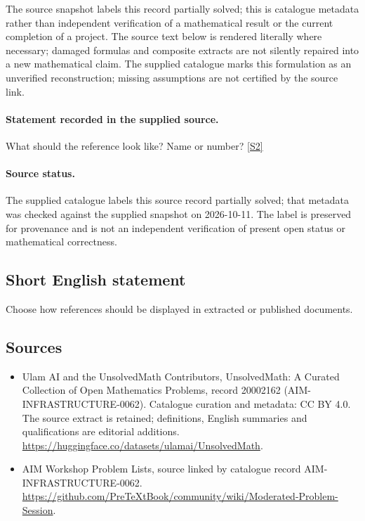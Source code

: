 \documentclass[11pt]{article}
\begin{document}
The source snapshot labels this record partially solved; this is catalogue metadata rather than independent verification of a mathematical result or the current completion of a project.
The source text below is rendered literally where necessary; damaged formulas and composite extracts are not silently repaired into a new mathematical claim.
The supplied catalogue marks this formulation as an unverified reconstruction; missing assumptions are not certified by the source link.
\paragraph{Statement recorded in the supplied source.}
What should the reference look like? Name or number? \href{https://github.com/PreTeXtBook/community/wiki/Moderated-Problem-Session}{[S2]}
\paragraph{Source status.}
The supplied catalogue labels this source record partially solved; that metadata was checked against the supplied snapshot on 2026-10-11. The label is preserved for provenance and is not an independent verification of present open status or mathematical correctness.
\subsection{Short English statement}
Choose how references should be displayed in extracted or published documents.
\subsection{Sources}
\begin{itemize}
\item[S1] Ulam AI and the UnsolvedMath Contributors, UnsolvedMath: A Curated Collection of Open Mathematics Problems, record 20002162 (AIM-INFRASTRUCTURE-0062). Catalogue curation and metadata: CC BY 4.0. The source extract is retained; definitions, English summaries and qualifications are editorial additions.
\url{https://huggingface.co/datasets/ulamai/UnsolvedMath}.
\item[S2] AIM Workshop Problem Lists, source linked by catalogue record AIM-INFRASTRUCTURE-0062.
\url{https://github.com/PreTeXtBook/community/wiki/Moderated-Problem-Session}.
\end{itemize}
\end{document}
